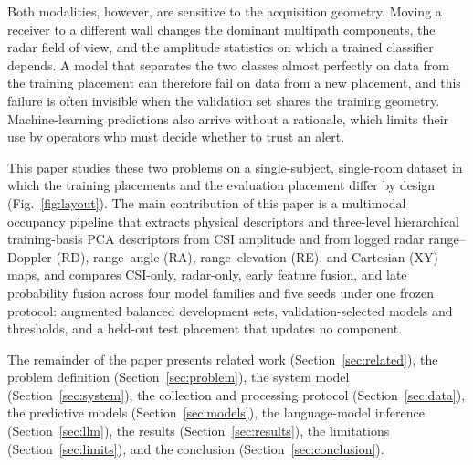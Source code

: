 \documentclass[conference,10pt,letterpaper]{IEEEtran}
\begin{document}
Both modalities, however, are sensitive to the acquisition geometry. Moving a receiver to a different wall changes the dominant multipath components, the radar field of view, and the amplitude statistics on which a trained classifier depends. A model that separates the two classes almost perfectly on data from the training placement can therefore fail on data from a new placement, and this failure is often invisible when the validation set shares the training geometry. Machine-learning predictions also arrive without a rationale, which limits their use by operators who must decide whether to trust an alert.

This paper studies these two problems on a single-subject, single-room dataset in which the training placements and the evaluation placement differ by design (Fig.~\ref{fig:layout}). The main contribution of this paper is a multimodal occupancy pipeline that extracts physical descriptors and three-level hierarchical training-basis PCA descriptors from CSI amplitude and from logged radar range--Doppler (RD), range--angle (RA), range--elevation (RE), and Cartesian (XY) maps, and compares CSI-only, radar-only, early feature fusion, and late probability fusion across four model families and five seeds under one frozen protocol: augmented balanced development sets, validation-selected models and thresholds, and a held-out test placement that updates no component.

The remainder of the paper presents related work (Section~\ref{sec:related}), the problem definition (Section~\ref{sec:problem}), the system model (Section~\ref{sec:system}), the collection and processing protocol (Section~\ref{sec:data}), the predictive models (Section~\ref{sec:models}), the language-model inference (Section~\ref{sec:llm}), the results (Section~\ref{sec:results}), the limitations (Section~\ref{sec:limits}), and the conclusion (Section~\ref{sec:conclusion}).
\end{document}
